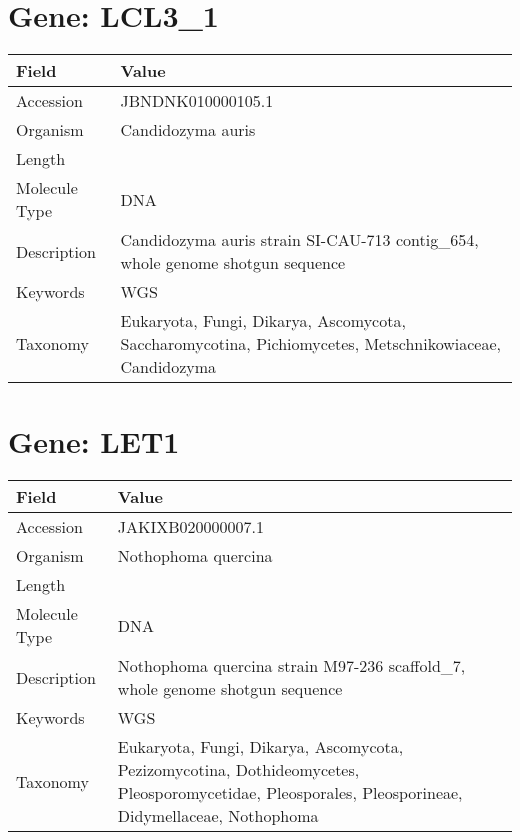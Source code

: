 \documentclass[10pt]{article}
\begin{document}
\section{Gene: LCL3\_1}
{\footnotesize
\begin{longtable}{>{\raggedright\arraybackslash}p{4.5cm} >{\raggedright\arraybackslash}p{11.5cm}}
\textbf{Field} & \textbf{Value} \\
\hline
Accession & JBNDNK010000105.1 \\
Organism & Candidozyma auris \\
Length & 128416 \\
Molecule Type & DNA \\
Description & Candidozyma auris strain SI-CAU-713 contig\_654, whole genome shotgun sequence \\
Keywords & WGS \\
Taxonomy & Eukaryota, Fungi, Dikarya, Ascomycota, Saccharomycotina, Pichiomycetes, Metschnikowiaceae, Candidozyma \\
\end{longtable}
}

\vspace{1em}
\section{Gene: LET1}
{\footnotesize
\begin{longtable}{>{\raggedright\arraybackslash}p{4.5cm} >{\raggedright\arraybackslash}p{11.5cm}}
\textbf{Field} & \textbf{Value} \\
\hline
Accession & JAKIXB020000007.1 \\
Organism & Nothophoma quercina \\
Length & 1165732 \\
Molecule Type & DNA \\
Description & Nothophoma quercina strain M97-236 scaffold\_7, whole genome shotgun sequence \\
Keywords & WGS \\
Taxonomy & Eukaryota, Fungi, Dikarya, Ascomycota, Pezizomycotina, Dothideomycetes, Pleosporomycetidae, Pleosporales, Pleosporineae, Didymellaceae, Nothophoma \\
\end{longtable}
}

\vspace{1em}
\end{document}
